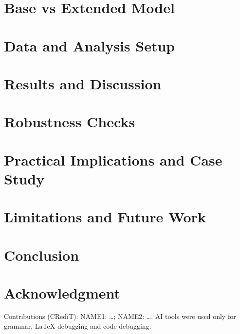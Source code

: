 \documentclass[conference]{IEEEtran} %
\begin{document}
\section{Base vs Extended Model}
\section{Data and Analysis Setup}
\section{Results and Discussion}
\section{Robustness Checks}
\section{Practical Implications and Case Study}
\section{Limitations and Future Work}
\section{Conclusion}
\section*{Acknowledgment}
Contributions (CRediT): NAME1: \dots; NAME2: \dots. AI tools were used only for grammar, LaTeX debugging and code debugging.


\end{document}

